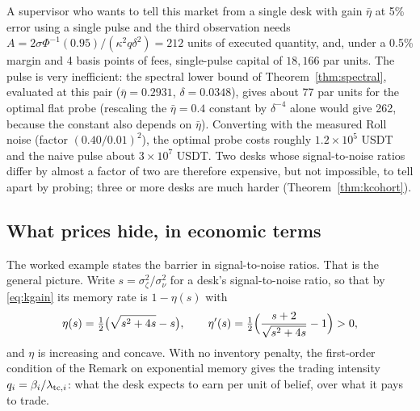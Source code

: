 A supervisor who wants to tell this market from a single desk with gain $\bar\eta$ at 5\% error using a single pulse and the third observation needs $A=2\sigma\Phi^{-1}(0.95)/(\kappa^2q\delta^2)=212$ units of executed quantity, and, under a 0.5\% margin and 4 basis points of fees, single-pulse capital of $18{,}166$ par units. The pulse is very inefficient: the spectral lower bound of Theorem~\ref{thm:spectral}, evaluated at this pair ($\bar\eta=0.2931$, $\delta=0.0348$), gives about 77 par units for the optimal flat probe (rescaling the $\bar\eta=0.4$ constant by $\delta^{-4}$ alone would give 262, because the constant also depends on $\bar\eta$). Converting with the measured Roll noise (factor $(0.40/0.01)^2$), the optimal probe costs roughly $1.2\times10^5$ USDT and the naive pulse about $3\times10^7$ USDT. Two desks whose signal-to-noise ratios differ by almost a factor of two are therefore expensive, but not impossible, to tell apart by probing; three or more desks are much harder (Theorem~\ref{thm:kcohort}).

\subsection{What prices hide, in economic terms}\label{sec:primitives}

The worked example states the barrier in signal-to-noise ratios. That is the general picture. Write $s=\sigma_\zeta^2/\sigma_\nu^2$ for a desk's signal-to-noise ratio, so that by \eqref{eq:kgain} its memory rate is $1-\eta(s)$ with
\[
\eta(s)=\tfrac12\bigl(\sqrt{s^2+4s}-s\bigr),\qquad \eta'(s)=\tfrac12\Bigl(\frac{s+2}{\sqrt{s^2+4s}}-1\Bigr)>0 ,
\]
and $\eta$ is increasing and concave. With no inventory penalty, the first-order condition of the Remark on exponential memory gives the trading intensity $q_i=\beta_i/\lambda_{{\rm tc},i}$: what the desk expects to earn per unit of belief, over what it pays to trade.

